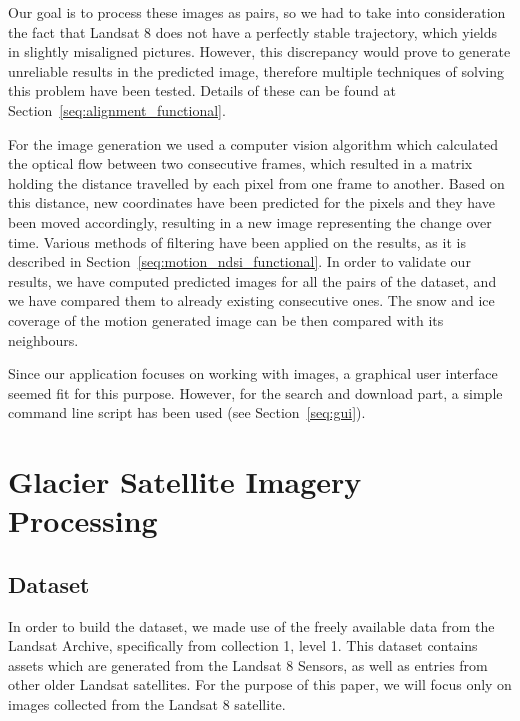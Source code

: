 \documentclass[12pt, a4paper]{report}
\begin{document}
	\par Our goal is to process these images as pairs, so we had to take into consideration the fact that Landsat 8 does not have a perfectly stable trajectory, which yields in slightly misaligned pictures. However, this discrepancy would prove to generate unreliable results in the predicted image, therefore multiple techniques of solving this problem have been tested. Details of these can be found at Section~\ref{seq:alignment_functional}.

	\par For the image generation we used a computer vision algorithm which calculated the optical flow between two consecutive frames, which resulted in a matrix holding the distance travelled by each pixel from one frame to another. Based on this distance, new coordinates have been predicted for the pixels and they have been moved accordingly, resulting in a new image representing the change over time. Various methods of filtering have been applied on the results, as it is described in Section~\ref{seq:motion_ndsi_functional}. In order to validate our results, we have computed predicted images for all the pairs of the dataset, and we have compared them to already existing consecutive ones. The snow and ice coverage of the motion generated image can be then compared with its neighbours.

	\par Since our application focuses on working with images, a graphical user interface seemed fit for this purpose. However, for the search and download part, a simple command line script has been used (see Section~\ref{seq:gui}).
	
	\newpage{}
	
	\chapter{Glacier Satellite Imagery Processing}
	\section{Dataset}

	\par In order to build the dataset, we made use of the freely available data from the Landsat Archive, specifically from collection 1, level 1. This dataset contains assets which are generated from the Landsat 8 Sensors, as well as entries from other older Landsat satellites. For the purpose of this paper, we will focus only on images collected from the Landsat 8 satellite.
	
\end{document}
